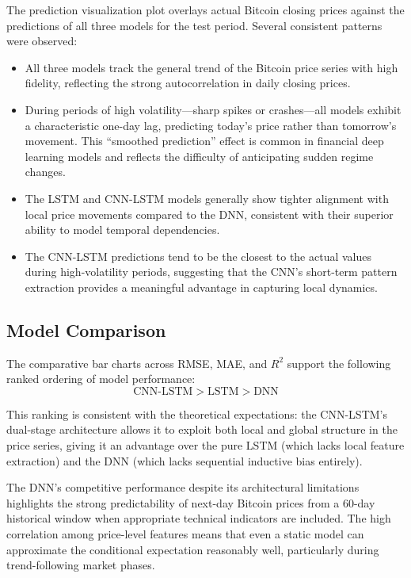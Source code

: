 \documentclass[12pt]{article}
\begin{document}
The prediction visualization plot overlays actual Bitcoin closing prices against the predictions of all three models for the test period. Several consistent patterns were observed:

\begin{itemize}[leftmargin=*]
    \item All three models track the general trend of the Bitcoin price series with high fidelity, reflecting the strong autocorrelation in daily closing prices.
    \item During periods of high volatility---sharp spikes or crashes---all models exhibit a characteristic one-day lag, predicting today's price rather than tomorrow's movement. This ``smoothed prediction'' effect is common in financial deep learning models and reflects the difficulty of anticipating sudden regime changes.
    \item The LSTM and CNN-LSTM models generally show tighter alignment with local price movements compared to the DNN, consistent with their superior ability to model temporal dependencies.
    \item The CNN-LSTM predictions tend to be the closest to the actual values during high-volatility periods, suggesting that the CNN's short-term pattern extraction provides a meaningful advantage in capturing local dynamics.
\end{itemize}

\subsection{Model Comparison}

The comparative bar charts across RMSE, MAE, and $R^2$ support the following ranked ordering of model performance:
\begin{equation}
    \text{CNN-LSTM} > \text{LSTM} > \text{DNN}
\end{equation}

This ranking is consistent with the theoretical expectations: the CNN-LSTM's dual-stage architecture allows it to exploit both local and global structure in the price series, giving it an advantage over the pure LSTM (which lacks local feature extraction) and the DNN (which lacks sequential inductive bias entirely).

The DNN's competitive performance despite its architectural limitations highlights the strong predictability of next-day Bitcoin prices from a 60-day historical window when appropriate technical indicators are included. The high correlation among price-level features means that even a static model can approximate the conditional expectation reasonably well, particularly during trend-following market phases.
\end{document}
